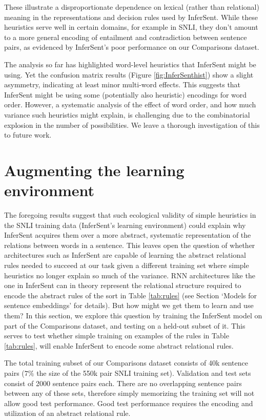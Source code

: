 These illustrate a disproportionate dependence on lexical (rather than relational) meaning in the representations and decision rules used by InferSent. While these heuristics serve well in certain domains, for example in SNLI, they don't amount to a more general encoding of entailment and contradiction between sentence pairs, as evidenced by InferSent's poor performance on our Comparisons dataset.

The analysis so far has highlighted word-level heuristics that InferSent might be using. Yet the confusion matrix results (Figure \ref{fig:InferSenthist}) show a slight asymmetry, indicating at least minor multi-word effects. This suggests that InferSent might be using some (potentially also heuristic) encodings for word order. However, a systematic analysis of the effect of word order, and how much variance such heuristics might explain, is challenging due to the combinatorial explosion in the number of possibilities. We leave a thorough investigation of this to future work.

\section{Augmenting the learning environment}
The foregoing results suggest that such ecological validity of simple heuristics in the SNLI training data (InferSent's learning environment) could explain why InferSent acquires them over a more abstract, systematic representation of the relations between words in a sentence. This leaves open the question of whether architectures such as InferSent are capable of learning the abstract relational rules needed to succeed at our task given a different training set where simple heuristics no longer explain so much of the variance. RNN architectures like the one in InferSent can in theory represent the relational structure required to encode the abstract rules of the sort in Table \ref{tab:rules} (see Section `Models for sentence embeddings' for details). But how might we get them to learn and use them? In this section, we explore this question by training the InferSent model on part of the Comparisons dataset, and testing on a held-out subset of it. This serves to test whether simple training on examples of the rules in Table \ref{tab:rules}, will enable InferSent to encode some abstract relational rules.

The total training subset of our Comparisons dataset consists of 40k sentence pairs ($7\%$ the size of the 550k pair SNLI training set). Validation and test sets consist of 2000 sentence pairs each. There are no overlapping sentence pairs between any of these sets, therefore simply memorizing the training set will not allow good test performance. Good test performance requires the encoding and utilization of an abstract relational rule.


